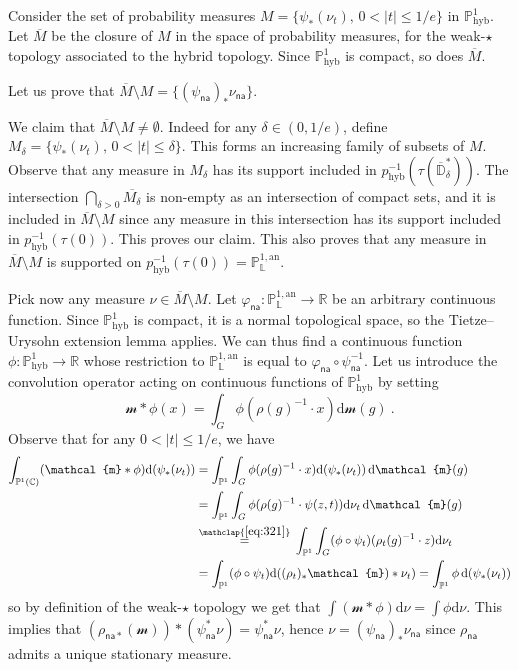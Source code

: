 \documentclass[AHL,Unicode,longabstracts]{cedram}
\DeclareMathOperator{\hyb}{hyb}
\newcommand{\cc}{\mathbb{C}}
\newcommand{\phyb}{{\mathbb{P}^1_{\mathrm{hyb}}}}
\newcommand{\sm}{\mathcal{m}}
\newcommand{\R}{{\mathbb R}}
\newcommand{\D}{\mathbb{D}}
\newcommand{\an}{\mathrm{an}}
\newcommand{\PP}{\mathbb{P}}
\newcommand{\Laurent}{\mathbb{L}}
\newcommand{\na}{\mathsf{na}}
\newcommand{\inv}{^{-1}}
\newcommand*{\dd}{\mathrm{d}}
\newcommand*{\dnu}{\dd \nu}
\newcommand*{\dsm}{\dd \sm}
\begin{document}
Consider the set of probability measures $M = \{ \psi_*(\nu_t), \, 0 < |t| \le 1/e\}$ in $\phyb$. Let $\overline{M}$ be the closure of $M$ in the space of probability measures, for the weak-$\star$ topology associated to the hybrid topology. Since $\PP^{1}_{\hyb}$ is compact, so does $\overline{M}$.

Let us prove that $\overline{M} \setminus M = \{(\psi_\na)_* \nu_{\na}\}$.

We claim that $\overline{M} \setminus M\neq \emptyset$. Indeed for any $\delta \in (0, 1/e)$, define $M_\delta =\{ \psi_*(\nu_t), \, 0 < |t| \le \delta\}$. This forms an increasing family of subsets of $M$. Observe that any measure in $M_\delta$ has its support included in $p_{\hyb}^{-1}(\tau(\overline{\D}^*_\delta))$. The intersection $\bigcap_{\delta>0} \overline{M_\delta}$ is non-empty as an intersection of compact sets, and it is included in $\overline{M} \setminus M$ since any measure in this intersection has its support included in $p_{\hyb}^{-1}(\tau(0))$. This proves our claim. This also proves that any measure in $\overline{M} \setminus M$ is supported on $p_{\hyb}^{-1}(\tau(0)) = \PP^{1,\an}_{\Laurent}$.

Pick now any measure $\nu \in \overline{M} \setminus M$. Let $\varphi_{\na} : \PP^{1,\an}_{\Laurent} \to \R$ be an arbitrary continuous function. Since $\phyb$ is compact, it is a normal topological space, so the Tietze--Urysohn extension lemma applies. We can thus find a continuous function $\phi: \phyb \to \R$ whose restriction to $\PP^{1,\an}_{\Laurent}$ is equal to $\varphi_{\na}\circ \psi_\na\inv$. Let us introduce the convolution operator acting on continuous functions of $\phyb$ by setting
\[
\sm \ast \phi (x) = \int_G \phi(\rho(g)^{-1} \cdot x) \dsm(g)~.
\]
Observe that for any $0 < |t| \le 1/e$, we have
\begin{align*}
\int_{\PP^1(\cc)} (\sm \ast \phi) \dd(\psi_*(\nu_t)) &=
\int_{\PP^1} \int_G \phi(\rho(g)^{-1} \cdot x) \dd(\psi_*(\nu_t)) \, \dsm(g)
\\ & = \int_{\PP^1} \int_G \phi(\rho(g) ^{-1} \cdot \psi(z,t)) \dnu_t \, \dsm(g)
\\
& \overset{\mathclap{\eqref{eq:321}}}{=}\, \int_{\PP^1} \int_G (\phi \circ \psi_t) (\rho_t(g)^{-1} \cdot z) \dnu_t
\\ &= \int_{\PP^1} (\phi \circ \psi_t) \dd((\rho_t)_*\sm) * \nu_t) = \int_{\PP^1} \phi \, \dd(\psi_{*}(\nu_t))
\end{align*}
so by definition of the weak-$\star$ topology we get that $\int (\sm \ast \phi) \dnu= \int \phi \dnu$. This implies that $(\rho_{\na*}(\sm)) \ast (\psi_\na^*\nu) = \psi_\na^*\nu$, hence $\nu = (\psi_\na)_*\nu_{\na}$ since $\rho_{\na}$ admits a unique stationary measure.
\end{document}
